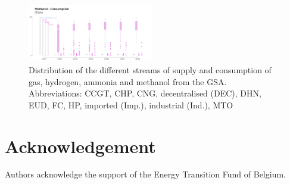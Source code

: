 \documentclass[11pt,twoside,a4paper,english]{article}
\begin{document}
\begin{appendices}
\begin{figure}[!htbp]
\includegraphics[width=0.49\textwidth]{figures/UQ_Methanol_Cons.pdf}
\caption{Distribution of the different streams of supply and consumption of gas, hydrogen, ammonia and methanol from the \acrfull{GSA}. Abbreviations: \acrfull{CCGT}, \acrfull{CHP}, \acrfull{CNG}, decentralised (DEC), \acrfull{DHN}, \acrfull{EUD}, \acrfull{FC}, \acrfull{HP}, imported (Imp.), industrial (Ind.), \acrfull{MTO}}
\label{fig:results_uq_prod_cons}
\end{figure}




\end{appendices}


\newpage

\section*{Acknowledgement}
Authors acknowledge the support of the Energy Transition Fund of Belgium.

% 
\printbibliography[heading=bibintoc]
\end{document}
